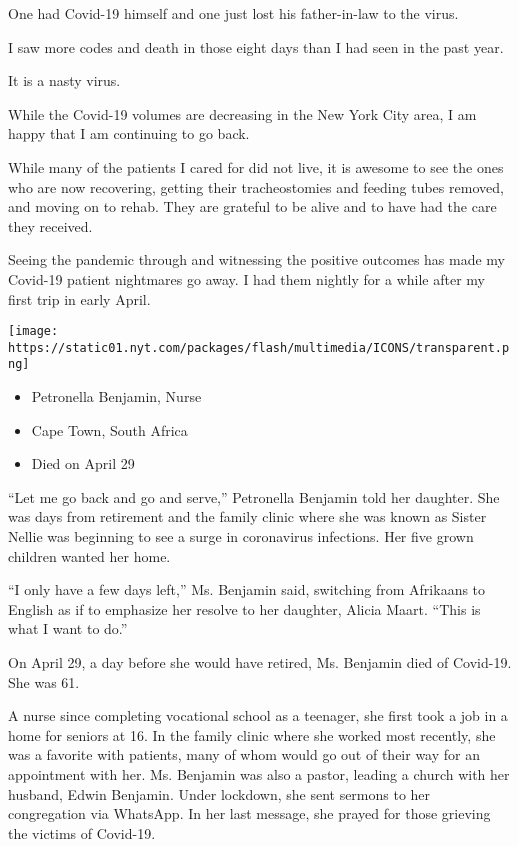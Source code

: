 One had Covid-19 himself and one just lost his father-in-law to the
virus.

I saw more codes and death in those eight days than I had seen in the
past year.

It is a nasty virus.

While the Covid-19 volumes are decreasing in the New York City area, I
am happy that I am continuing to go back.

While many of the patients I cared for did not live, it is awesome to
see the ones who are now recovering, getting their tracheostomies and
feeding tubes removed, and moving on to rehab. They are grateful to be
alive and to have had the care they received.

Seeing the pandemic through and witnessing the positive outcomes has
made my Covid-19 patient nightmares go away. I had them nightly for a
while after my first trip in early April.

\texttt{[image: https://static01.nyt.com/packages/flash/multimedia/ICONS/transparent.png]}

\begin{itemize}
\tightlist
\item
  Petronella Benjamin, Nurse
\item
  Cape Town, South Africa
\item
  Died on April 29
\end{itemize}

``Let me go back and go and serve,'' Petronella Benjamin told her
daughter. She was days from retirement and the family clinic where she
was known as Sister Nellie was beginning to see a surge in coronavirus
infections. Her five grown children wanted her home.

``I only have a few days left,'' Ms. Benjamin said, switching from
Afrikaans to English as if to emphasize her resolve to her daughter,
Alicia Maart. ``This is what I want to do.''

On April 29, a day before she would have retired, Ms. Benjamin died of
Covid-19. She was 61.

A nurse since completing vocational school as a teenager, she first took
a job in a home for seniors at 16. In the family clinic where she worked
most recently, she was a favorite with patients, many of whom would go
out of their way for an appointment with her. Ms. Benjamin was also a
pastor, leading a church with her husband, Edwin Benjamin. Under
lockdown, she sent sermons to her congregation via WhatsApp. In her last
message, she prayed for those grieving the victims of Covid-19.


